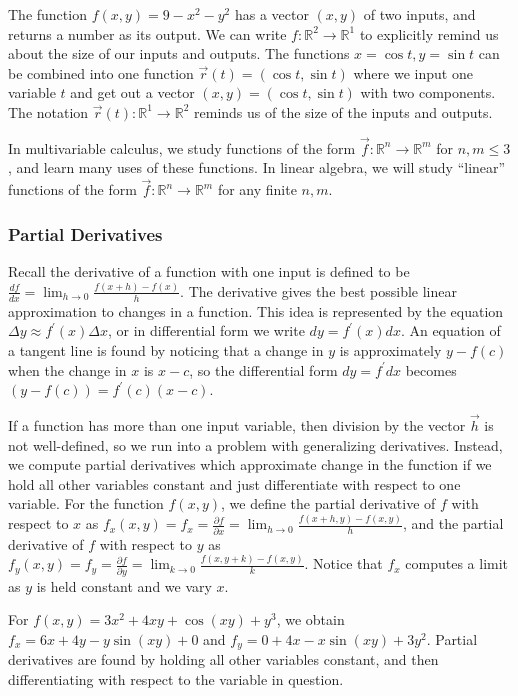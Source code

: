 \documentclass[10pt]{article}
\newcommand{\ds}{\displaystyle}
\begin{document}
The function $f(x,y) = 9-x^2-y^2$ has a vector $(x,y)$ of two inputs, and returns a number as its output. We can write $f:{\mathbb{R}}^2\to {\mathbb{R}}^1$ to explicitly remind us about the size of our inputs and outputs. The functions $x=\cos t, y=\sin t$ can be combined into one function $\vec r(t) = (\cos t,\sin t)$ where we input one variable $t$ and get out a vector $(x,y) = (\cos t,\sin t)$ with two components.  The notation $\vec r(t):{\mathbb{R}}^1\to {\mathbb{R}}^2$ reminds us of the size of the inputs and outputs. 

In multivariable calculus, we study functions of the form $\vec f:{\mathbb{R}}^n\to {\mathbb{R}}^m$ for $n,m\leq 3$, and learn many uses of these functions.  In linear algebra, we will study ``linear'' functions of the form $\vec f:{\mathbb{R}}^n\to {\mathbb{R}}^m$ for any finite $n,m$.

\subsubsection{Partial Derivatives}

Recall the derivative of a function with one input is defined to be $\ds \frac{d f}{dx} = \lim_{h\to 0}\frac{f(x+h)-f(x)}{h}$. The derivative gives the best possible linear approximation to changes in a function. This idea is represented by the equation $\Delta  y \approx f^\prime(x)\Delta x$, or in differential form we write $d y=f^\prime(x) dx$.  An equation of a tangent line is found by noticing that a change in $y$ is approximately $y-f(c)$ when the change in $x$ is $x-c$, so the differential form $dy=f^\prime dx$ becomes $(y-f(c))=f^\prime(c)(x-c)$.

If a function has more than one input variable, then division by the vector $\vec h$ is not well-defined, so we run into a problem with generalizing derivatives.  Instead, we compute partial derivatives which approximate change in the function if we hold all other variables constant and just differentiate with respect to one variable.  For the function $f(x,y)$, we define the partial derivative of $f$ with respect to $x$ as $\ds f_x(x,y)=f_x = \frac{\partial f}{\partial x}= \lim_{h\to 0}\frac{f(x+h,y)-f(x,y)}{h}$, and the partial derivative of $f$ with respect to $y$ as $\ds f_y(x,y)=f_y =\frac{\partial f}{\partial y}= \lim_{k\to 0}\frac{f(x,y+k)-f(x,y)}{k}$. Notice that $f_x$ computes a limit as $y$ is held constant and we vary $x$. 

For $f(x,y)=3x^2+4xy+\cos(xy)+y^3$, we obtain $f_x=6x+4y-y\sin(xy)+0$ and $f_y=0+4x-x\sin(xy)+3y^2$. Partial derivatives are found by holding all other variables constant, and then differentiating with respect to the variable in question.
\end{document}
